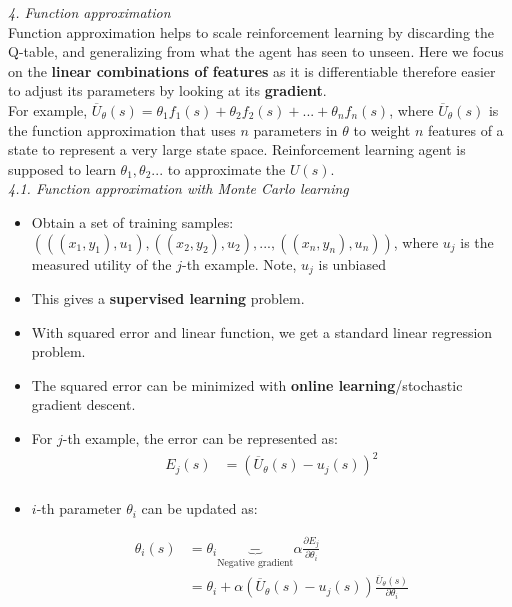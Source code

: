 \documentclass[12pt]{article}
\begin{document}
\noindent
\textsl{4. Function approximation}\\

\noindent
Function approximation helps to scale reinforcement learning by discarding the Q-table, and generalizing from what the agent has seen to unseen. Here we focus on the \textbf{linear combinations of features} as it is differentiable therefore easier to adjust its parameters by looking at its \textbf{gradient}.  \\

\noindent
For example, $\overline U_{\theta} (s) = \theta_1f_1(s) + \theta_2f_2(s) + ... + \theta_nf_n(s)$, where $\overline U_{\theta} (s)$ is the function approximation that uses $n$ parameters in $\theta$ to weight $n$ features of a state to represent a very large state space. Reinforcement learning agent is supposed to learn $\theta_1, \theta_2 ... $ to approximate the $U(s)$.\\

\noindent
\textsl{4.1. Function approximation with Monte Carlo learning}\\
\begin{itemize}
\item Obtain a set of training samples: $(((x_1, y_1), u_1), ((x_2, y_2), u_2), ..., ((x_n, y_n), u_n ))$, where $u_j$ is the measured utility of the $j$-th example. Note, $u_j$ is unbiased 
\item This gives a \textbf{supervised learning} problem. 
\item With squared error and linear function, we get a standard linear regression problem. 
\item The squared error can be minimized with \textbf{online learning}/stochastic gradient descent.
\item For $j$-th example, the error can be represented as:
\begin{equation} 
\begin{split}
E_j (s) & = (\overline U_\theta(s) - u_j(s))^2  \\
\end{split}
\end{equation}

\item $i$-th parameter $\theta_i$ can be updated as:

\begin{equation}
\begin{split}
\theta_i (s) & = \theta_i \underbrace{-}_{\text{Negative gradient}} \alpha \frac{\partial E_j}{\partial \theta_i}  \\
 & = \theta_i + \alpha (\overline U_\theta(s) - u_j(s)) \frac{\overline U_\theta(s)}{\partial \theta_i} \\
\end{split}
\end{equation}

\end{itemize}
\end{document}
